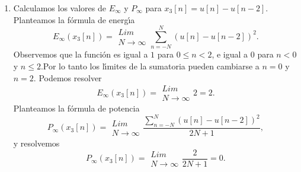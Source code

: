 \begin{enumerate}
\item Calculamos los valores de $E_{\infty }$ y $P_{\infty }$ para 
$x_{3}\left[ n\right] =u\left[ n\right] -u\left[ n-2\right]$.
Planteamos la f\'{o}rmula de energ\'{\i}a
\begin{equation}
E_{\infty }\left( x_{3}\left[ n\right] \right) = 
\begin{array}{c}
Lim \\ 
N\rightarrow \infty
\end{array}
\sum_{n=-N}^{N}\left( u\left[ n\right] -u\left[ n-2\right] \right) ^{2}.
\end{equation}
Observemos que la funci\'{o}n es igual a $1$ para $0 \leq n < 2$, e
igual a $0$ para $n < 0$ y $n \leq 2$.Por lo tanto los l\'{\i}mites
de la sumatoria pueden cambiarse a $n = 0$ y $n = 2$.
Podemos resolver
\begin{equation}
E_{\infty }\left( x_{3}\left[ n\right] \right) = 
\begin{array}{c}
Lim \\ 
N\rightarrow \infty
\end{array}
2=2.
\end{equation}
Planteamos la f\'{o}rmula de potencia
\begin{equation}
P_{\infty }\left( x_{3}\left[ n\right] \right) = 
\begin{array}{c}
Lim \\ 
N\rightarrow \infty
\end{array}
\frac{\sum_{n=-N}^{N}\left( u\left[ n\right] -u\left[ n-2\right] \right)
^{2}}{2N+1},
\end{equation}
y resolvemos
\begin{equation}
P_{\infty }\left( x_{3}\left[ n\right] \right) = 
\begin{array}{c}
Lim \\ 
N\rightarrow \infty
\end{array}
\frac{2}{2N+1}=0.
\end{equation}


\end{enumerate}
